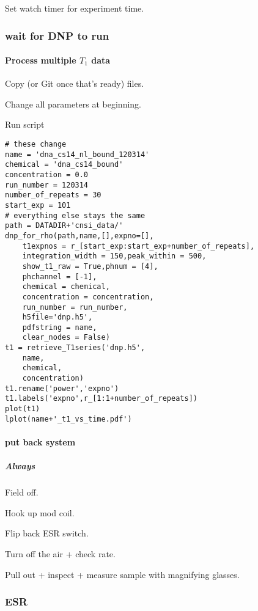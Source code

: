 Set watch timer for experiment time.

\subsubsection{wait for DNP to run}

\paragraph{Process multiple $T_1$ data}
Copy (or Git once that's ready) files.

Change all parameters at beginning.

Run script

\begin{scriptsize}
\begin{lstlisting}
# these change
name = 'dna_cs14_nl_bound_120314'
chemical = 'dna_cs14_bound'
concentration = 0.0
run_number = 120314
number_of_repeats = 30
start_exp = 101
# everything else stays the same
path = DATADIR+'cnsi_data/'
dnp_for_rho(path,name,[],expno=[],
    t1expnos = r_[start_exp:start_exp+number_of_repeats],
    integration_width = 150,peak_within = 500,
    show_t1_raw = True,phnum = [4],
    phchannel = [-1],
    chemical = chemical,
    concentration = concentration,
    run_number = run_number,
    h5file='dnp.h5',
    pdfstring = name,
    clear_nodes = False)
t1 = retrieve_T1series('dnp.h5',
    name,
    chemical,
    concentration)
t1.rename('power','expno')
t1.labels('expno',r_[1:1+number_of_repeats])
plot(t1)
lplot(name+'_t1_vs_time.pdf')
\end{lstlisting}
\end{scriptsize}
\paragraph{put back system}
\subparagraph{Always}
Field off.

Hook up mod coil.

Flip back ESR switch.

Turn off the air + check rate.

Pull out + inspect + measure sample with magnifying glasses.

\subsubsection{ESR}


